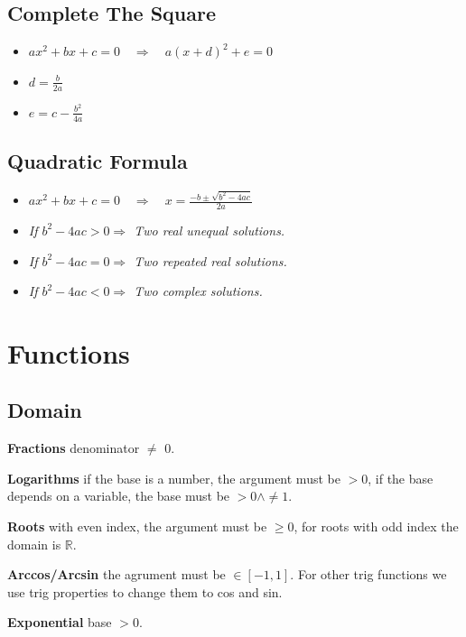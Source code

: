 \documentclass[8pt,a4paper]{extarticle}     %
\theoremstyle{definition}
\theoremstyle{definition}
\theoremstyle{definition}
\newcommand{\R}{\mathbb{R}}
\begin{document}
\begin{multicols}{4}
\subsection{Complete The Square}
\begin{itemize}[leftmargin=1em, label={·}]
	\item[] \boldmath $ax^2+bx+c = 0 \quad \Rightarrow \quad a(x+d)^2 + e = 0$ \unboldmath
	\item $d = \frac{b}{2a}$
	\item $e = c - \frac{b^2}{4a}$
\end{itemize}

\subsection{Quadratic Formula}
\begin{itemize}[leftmargin=1em, label={·}]
	\item[] \boldmath $ax^2+bx+c = 0 \quad \Rightarrow \quad x = \frac{-b \pm \sqrt{b^2-4ac}}{2a}$ \unboldmath
	\item \textit{If $b^2-4ac > 0 \Rightarrow$ Two real unequal solutions.}
	\item \textit{If $b^2-4ac = 0 \Rightarrow$ Two repeated real solutions.}
	\item \textit{If $b^2-4ac < 0 \Rightarrow$ Two complex solutions.}
\end{itemize}

\vfill\null
\columnbreak

\section{Functions}
\subsection{Domain}
\begin{bulletlist}
	\item \textbf{Fractions} denominator $\neq$ 0.
	\item \textbf{Logarithms} if the base is a number, the argument must be $> 0$, if the base depends on a variable, the base must be $> 0 \land \neq 1$.
	\item \textbf{Roots} with even index, the argument must be $\geq 0$, for roots with odd index the domain is $\R$.
	\item \textbf{Arccos/Arcsin} the agrument must be $\in [-1,1]$. For other trig functions we use trig properties to change them to cos and sin.
	\item \textbf{Exponential} base $> 0$.
\end{bulletlist}

\end{multicols}
\end{document}
